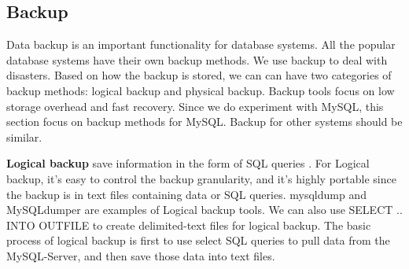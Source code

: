 \subsection{Backup}

Data backup is an important functionality for database systems. All the popular database systems have their own backup methods. We use backup to deal with disasters. Based on how the backup is stored, we can can have two categories of backup methods: logical backup and physical backup. Backup tools focus on low storage overhead and fast recovery. Since we do experiment with MySQL, this section focus on backup methods for MySQL. Backup for other systems should be similar.




\textbf{Logical backup} save information in the form of SQL queries \citep{mysqlbackupdocumentation}.  For Logical backup, it's easy to control the backup granularity, and it's highly portable since the backup is in text files containing data or SQL queries. mysqldump \citep{mysqldump-doc} and MySQLdumper\citep{mysqldumpper} are examples of Logical backup tools. We can also use SELECT .. INTO OUTFILE to create delimited-text files for logical backup. The basic process of logical backup is first to use select SQL queries to pull data from the MySQL-Server, and then save those data into text files.



